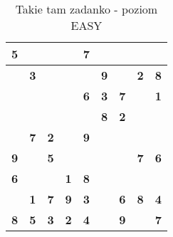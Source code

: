 \begin{table}[h]
\centering
\begin{tabular}{|c|c|c|c|c|c|c|c|c|} %
\hline
\textbf{5} & \textbf{}  & \textbf{}  & \textbf{}  & \textbf{7} & \textbf{}  & \textbf{}  & \textbf{}  & \textbf{}  \\ \hline
\textbf{}  & \textbf{3} & \textbf{}  & \textbf{}  & \textbf{}  & \textbf{9} & \textbf{}  & \textbf{2} & \textbf{8} \\ \hline
\textbf{}  & \textbf{}  & \textbf{}  & \textbf{}  & \textbf{6} & \textbf{3} & \textbf{7} & \textbf{}  & \textbf{1} \\ \hline
\textbf{}  & \textbf{}  & \textbf{}  & \textbf{}  & \textbf{}  & \textbf{8} & \textbf{2} & \textbf{}  & \textbf{}  \\ \hline
\textbf{}  & \textbf{7} & \textbf{2} & \textbf{}  & \textbf{9} & \textbf{}  & \textbf{}  & \textbf{}  & \textbf{}  \\ \hline
\textbf{9} & \textbf{}  & \textbf{5} & \textbf{}  & \textbf{}  & \textbf{}  & \textbf{}  & \textbf{7} & \textbf{6} \\ \hline
\textbf{6} & \textbf{}  & \textbf{}  & \textbf{1} & \textbf{8} & \textbf{}  & \textbf{}  & \textbf{}  & \textbf{}  \\ \hline
\textbf{}  & \textbf{1} & \textbf{7} & \textbf{9} & \textbf{3} & \textbf{}  & \textbf{6} & \textbf{8} & \textbf{4} \\ \hline
\textbf{8} & \textbf{5} & \textbf{3} & \textbf{2} & \textbf{4} & \textbf{}  & \textbf{9} & \textbf{}  & \textbf{7} \\ \hline
\end{tabular}
\caption{Takie tam zadanko - poziom EASY}
\label{tab:Sudoku1}
\end{table}